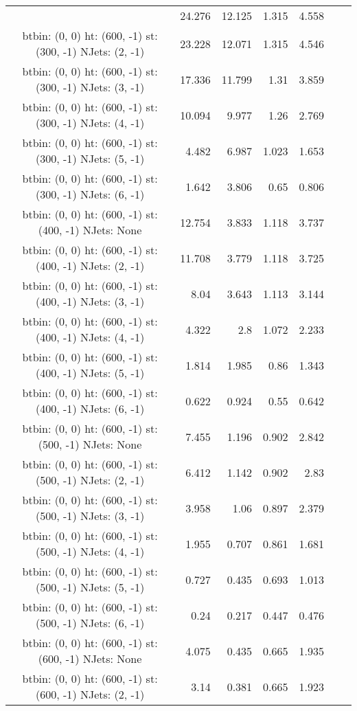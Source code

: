 \documentclass[12pt]{paper}
\begin{document}
\begin{landscape}
\begin{longtable}{c|r|r|r|r|r|r}
 & 24.276 & 12.125 & 1.315 & 4.558\\
btbin:  (0, 0) ht:  (600, -1) st:  (300, -1) NJets:  (2, -1)
 & 23.228 & 12.071 & 1.315 & 4.546\\
btbin:  (0, 0) ht:  (600, -1) st:  (300, -1) NJets:  (3, -1)
 & 17.336 & 11.799 & 1.31 & 3.859\\
btbin:  (0, 0) ht:  (600, -1) st:  (300, -1) NJets:  (4, -1)
 & 10.094 & 9.977 & 1.26 & 2.769\\
btbin:  (0, 0) ht:  (600, -1) st:  (300, -1) NJets:  (5, -1)
 & 4.482 & 6.987 & 1.023 & 1.653\\
btbin:  (0, 0) ht:  (600, -1) st:  (300, -1) NJets:  (6, -1)
 & 1.642 & 3.806 & 0.65 & 0.806\\
btbin:  (0, 0) ht:  (600, -1) st:  (400, -1) NJets:  None
 & 12.754 & 3.833 & 1.118 & 3.737\\
btbin:  (0, 0) ht:  (600, -1) st:  (400, -1) NJets:  (2, -1)
 & 11.708 & 3.779 & 1.118 & 3.725\\
btbin:  (0, 0) ht:  (600, -1) st:  (400, -1) NJets:  (3, -1)
 & 8.04 & 3.643 & 1.113 & 3.144\\
btbin:  (0, 0) ht:  (600, -1) st:  (400, -1) NJets:  (4, -1)
 & 4.322 & 2.8 & 1.072 & 2.233\\
btbin:  (0, 0) ht:  (600, -1) st:  (400, -1) NJets:  (5, -1)
 & 1.814 & 1.985 & 0.86 & 1.343\\
btbin:  (0, 0) ht:  (600, -1) st:  (400, -1) NJets:  (6, -1)
 & 0.622 & 0.924 & 0.55 & 0.642\\
btbin:  (0, 0) ht:  (600, -1) st:  (500, -1) NJets:  None
 & 7.455 & 1.196 & 0.902 & 2.842\\
btbin:  (0, 0) ht:  (600, -1) st:  (500, -1) NJets:  (2, -1)
 & 6.412 & 1.142 & 0.902 & 2.83\\
btbin:  (0, 0) ht:  (600, -1) st:  (500, -1) NJets:  (3, -1)
 & 3.958 & 1.06 & 0.897 & 2.379\\
btbin:  (0, 0) ht:  (600, -1) st:  (500, -1) NJets:  (4, -1)
 & 1.955 & 0.707 & 0.861 & 1.681\\
btbin:  (0, 0) ht:  (600, -1) st:  (500, -1) NJets:  (5, -1)
 & 0.727 & 0.435 & 0.693 & 1.013\\
btbin:  (0, 0) ht:  (600, -1) st:  (500, -1) NJets:  (6, -1)
 & 0.24 & 0.217 & 0.447 & 0.476\\
btbin:  (0, 0) ht:  (600, -1) st:  (600, -1) NJets:  None
 & 4.075 & 0.435 & 0.665 & 1.935\\
btbin:  (0, 0) ht:  (600, -1) st:  (600, -1) NJets:  (2, -1)
 & 3.14 & 0.381 & 0.665 & 1.923\\

\end{longtable}
\end{landscape}
\end{document}
